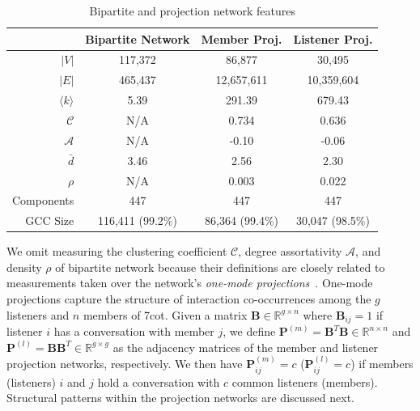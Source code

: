 \begin{table}
	\setlength\extrarowheight{0.5pt}
	\begin{tabular}{r| c | c | c}
		& Bipartite Network & Member Proj. & Listener Proj. \\
		\hline
		$|V|$ & 117,372 & 86,877 & 30,495 \\
		$|E|$ & 465,437 & 12,657,611 & 10,359,604 \\
		$\langle k \rangle$ & 5.39 & 291.39 & 679.43 \\
		$\mathcal{C}$ & N/A & 0.734 & 0.636 \\ %
		$\mathcal{A}$ & N/A & -0.10 & -0.06 \\
		$\bar{d}$ & 3.46 & 2.56 & 2.30 \\
		$\rho$ & N/A & 0.003 & 0.022 \\ %
		Components & 447 & 447 & 447 \\
		GCC Size & 116,411 (99.2\%) & 86,364 (99.4\%) & 30,047 (98.5\%) \\
	\end{tabular}
	\caption{Bipartite and projection network features}
	
	\label{tab:proj}
\end{table}

We omit measuring the clustering coefficient $\mathcal{C}$, degree
assortativity $\mathcal{A}$, and density $\rho$ of bipartite network because their 
definitions are closely related to measurements taken over the network's
{\em one-mode projections}~\cite{guillaume2006bipartite}.
One-mode projections capture the structure of 
interaction co-occurrences among the $g$ listeners and $n$ members
of 7cot.
Given a matrix $\mathbf{B} \in \mathbb{R}^{g \times n}$ where 
$\mathbf{B}_{ij} = 1$ if listener $i$ has a conversation
with member $j$, we define $\mathbf{P}^{(m)} = \mathbf{B}^T\mathbf{B} \in \mathbb{R}^{n \times n}$ and 
$\mathbf{P}^{(l)} = \mathbf{B}\mathbf{B}^T \in \mathbb{R}^{g \times g}$ as the adjacency matrices 
of the member and listener projection networks, respectively. We then have $\mathbf{P}^{(m)}_{ij} = c$ 
($\mathbf{P}^{(l)}_{ij} = c$)
if members (listeners) $i$ and $j$ hold a conversation 
with $c$ common listeners (members). Structural patterns within the
projection networks are discussed next. 

